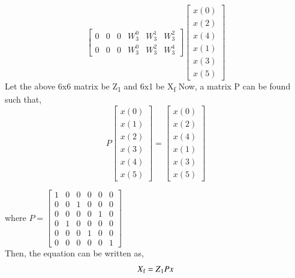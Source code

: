 \documentclass[journal,12pt,twocolumn]{IEEEtran}
\renewcommand\thesection{\arabic{section}}
\begin{document}
\begin{enumerate}[label=\thesection.\arabic*.,ref=\thesection.\theenumi]
\begin{equation}
\begin{bmatrix}
0 & 0 & 0 & W^{0}_{3} & W^{1}_{3} & W^{2}_{3}\\
0 & 0 & 0 & W^{0}_{3} & W^{2}_{3} & W^{4}_{3}
\end{bmatrix}
\begin{bmatrix}
x(0) \\ 
x(2) \\ 
x(4) \\ 
x(1) \\ 
x(3) \\ 
x(5) 
\end{bmatrix}   
\end{equation}
Let the above 6x6 matrix be Z\textsubscript{1} and 6x1 be X\textsubscript{f}
Now, a matrix P can be found such that,
\begin{equation}
P
\begin{bmatrix}
x(0) \\ 
x(1) \\ 
x(2) \\ 
x(3) \\ 
x(4) \\ 
x(5) 
\end{bmatrix}
= 
\begin{bmatrix}
x(0) \\ 
x(2) \\ 
x(4) \\ 
x(1) \\ 
x(3) \\ 
x(5) 
\end{bmatrix}
\end{equation}

where $P =
\begin{bmatrix}
1 & 0 & 0 & 0 & 0 & 0\\
0 & 0 & 1 & 0 & 0 & 0\\
0 & 0 & 0 & 0 & 1 & 0\\
0 & 1 & 0 & 0 & 0 & 0\\
0 & 0 & 0 & 1 & 0 & 0\\
0 & 0 & 0 & 0 & 0 & 1
\end{bmatrix} $
\\
Then, the equation can be written as,
\begin{equation}
X\textsubscript{f} = Z\textsubscript{1}Px
\end{equation}

\end{enumerate}
\end{document}
